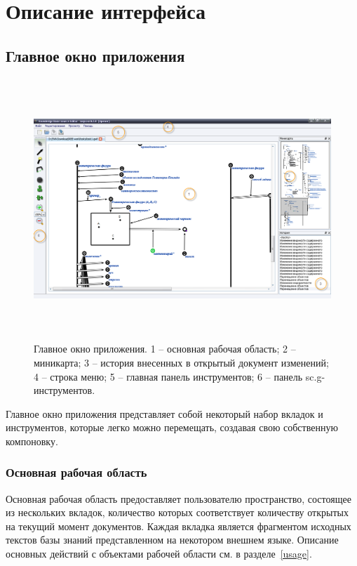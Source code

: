 \section{Описание интерфейса}

\subsection{Главное окно приложения}
\begin{figure}[h]
	\includegraphics[width=16.23cm, height=9.82cm]{../images/mainwindow.png}
	\caption{Главное окно приложения. 1 – основная рабочая область; 2 – миникарта; 3 – история внесенных в открытый документ 				изменений; 4 – строка меню; 5 – главная панель инструментов; 6 – панель sc.g-инструментов.}
	\label{mainwindow}
\end{figure}
Главное окно приложения представляет собой некоторый набор вкладок и инструментов, которые легко можно перемещать, создавая свою собственную компоновку.

\subsubsection{Основная рабочая область}

Основная рабочая область предоставляет пользователю пространство, состоящее из нескольких вкладок, количество которых соответствует количеству открытых на текущий момент документов. Каждая вкладка является фрагментом исходных текстов базы знаний представленном на некотором внешнем языке. Описание основных действий с объектами рабочей области см. в разделе~\ref{usage}.

